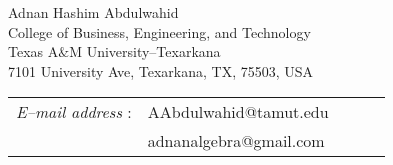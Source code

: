 \documentclass[11pt]{amsart}
\theoremstyle{remark}
\theoremstyle{definition}
\theoremstyle{remark}
\numberwithin{equation}{section}
\begin{document}












\vspace{.4cm}

\vspace*{3mm} 
\begin{flushright}
\begin{minipage}{148mm}\sc\footnotesize
	
	Adnan Hashim Abdulwahid\\
	College of Business, Engineering, and Technology \\
	Texas A$\&$M University--Texarkana\\
	7101 University Ave, Texarkana, TX, 75503,  USA
	
	{\tt \begin{tabular}{lllll}
			{\it E--mail address} :	&  {\color{blue}
				AAbdulwahid@tamut.edu}\\
			&  {\color{blue} adnanalgebra@gmail.com}\\
	\end{tabular} }\vspace*{3mm}
	
	\vspace{.2cm}
\end{minipage}
\end{flushright}
\end{document}

